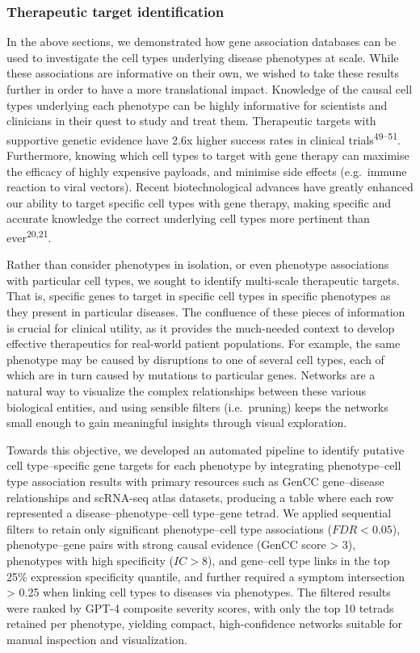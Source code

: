 \documentclass[
]{article}
\begin{document}
\subsubsection{Therapeutic target
identification}\label{therapeutic-target-identification-1}

In the above sections, we demonstrated how gene association databases
can be used to investigate the cell types underlying disease phenotypes
at scale. While these associations are informative on their own, we
wished to take these results further in order to have a more
translational impact. Knowledge of the causal cell types underlying each
phenotype can be highly informative for scientists and clinicians in
their quest to study and treat them. Therapeutic targets with supportive
genetic evidence have 2.6x higher success rates in clinical
trials\textsuperscript{49--51}. Furthermore, knowing which cell types to
target with gene therapy can maximise the efficacy of highly expensive
payloads, and minimise side effects (e.g.~immune reaction to viral
vectors). Recent biotechnological advances have greatly enhanced our
ability to target specific cell types with gene therapy, making specific
and accurate knowledge the correct underlying cell types more pertinent
than ever\textsuperscript{20,21}.

Rather than consider phenotypes in isolation, or even phenotype
associations with particular cell types, we sought to identify
multi-scale therapeutic targets. That is, specific genes to target in
specific cell types in specific phenotypes as they present in particular
diseases. The confluence of these pieces of information is crucial for
clinical utility, as it provides the much-needed context to develop
effective therapeutics for real-world patient populations. For example,
the same phenotype may be caused by disruptions to one of several cell
types, each of which are in turn caused by mutations to particular
genes. Networks are a natural way to visualize the complex relationships
between these various biological entities, and using sensible filters
(i.e.~pruning) keeps the networks small enough to gain meaningful
insights through visual exploration.

Towards this objective, we developed an automated pipeline to identify
putative cell type--specific gene targets for each phenotype by
integrating phenotype--cell type association results with primary
resources such as GenCC gene--disease relationships and scRNA-seq atlas
datasets, producing a table where each row represented a
disease--phenotype--cell type--gene tetrad. We applied sequential
filters to retain only significant phenotype--cell type associations
(\(FDR<0.05\)), phenotype--gene pairs with strong causal evidence (GenCC
score \textgreater{} 3), phenotypes with high specificity (\(IC>8\)),
and gene--cell type links in the top 25\% expression specificity
quantile, and further required a symptom intersection \textgreater{}
0.25 when linking cell types to diseases via phenotypes. The filtered
results were ranked by GPT-4 composite severity scores, with only the
top 10 tetrads retained per phenotype, yielding compact, high-confidence
networks suitable for manual inspection and visualization.
\end{document}
